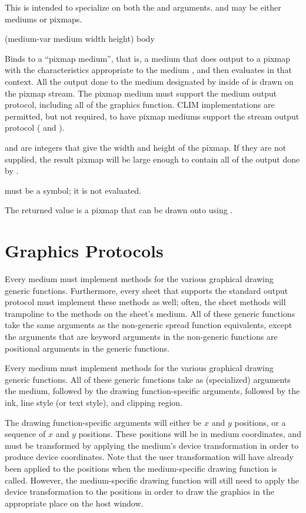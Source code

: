 This is intended to specialize on both the  and
 arguments.   and  may be
either mediums or pixmaps.


 {(medium-var medium \key width height) \body body}

Binds  to a ``pixmap medium'', that is, a medium that does
output to a pixmap with the characteristics appropriate to the medium
, and then evaluates  in that context.  All the output done
to the medium designated by  inside of  is drawn on
the pixmap stream.  The pixmap medium must support the medium output protocol,
including all of the graphics function.  CLIM implementations are permitted, but
not required, to have pixmap mediums support the stream output protocol
( and ).

 and  are integers that give the width and height of the
pixmap.  If they are not supplied, the result pixmap will be large enough to
contain all of the output done by .

 must be a symbol; it is not evaluated.

The returned value is a pixmap that can be drawn onto  using
.


\section {Graphics Protocols\label{graphics-protocols}}

Every medium must implement methods for the various graphical drawing generic
functions.  Furthermore, every sheet that supports the standard output protocol
must implement these methods as well; often, the sheet methods will trampoline
to the methods on the sheet's medium.  All of these generic functions take the
same arguments as the non-generic spread function equivalents, except the
arguments that are keyword arguments in the non-generic functions are positional
arguments in the generic functions.

Every medium must implement methods for the various graphical drawing generic
functions.  All of these generic functions take as (specialized) arguments the
medium, followed by the drawing function-specific arguments, followed by the
ink, line style (or text style), and clipping region.

The drawing function-specific arguments will either be $x$ and $y$ positions,
or a sequence of $x$ and $y$ positions.  These positions will be in medium
coordinates, and must be transformed by applying the medium's device
transformation in order to produce device coordinates.  Note that the user
transformation will have already been applied to the positions when the
medium-specific drawing function is called.  However, the medium-specific
drawing function will still need to apply the device transformation to the
positions in order to draw the graphics in the appropriate place on the host
window.

